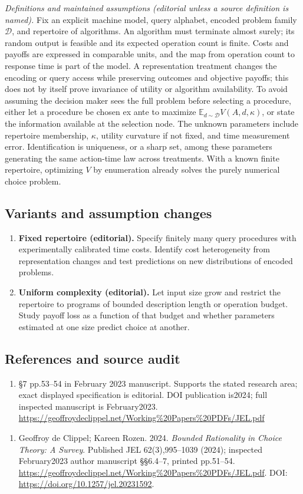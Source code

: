 \documentclass[11pt,a4paper]{article}
\begin{document}
\emph{Definitions and maintained assumptions (editorial unless a source definition is named).} Fix an explicit machine model, query alphabet, encoded problem family \(\mathcal D\), and repertoire of algorithms. An algorithm must terminate almost surely; its random output is feasible and its expected operation count is finite. Costs and payoffs are expressed in comparable units, and the map from operation count to response time is part of the model. A representation treatment changes the encoding or query access while preserving outcomes and objective payoffs; this does not by itself prove invariance of utility or algorithm availability. To avoid assuming the decision maker sees the full problem before selecting a procedure, either let a procedure be chosen ex ante to maximize \(\mathbb E_{d\sim\mathcal D}V(A,d,\kappa)\), or state the information available at the selection node. The unknown parameters include repertoire membership, \(\kappa\), utility curvature if not fixed, and time measurement error. Identification is uniqueness, or a sharp set, among these parameters generating the same action-time law across treatments. With a known finite repertoire, optimizing \(V\) by enumeration already solves the purely numerical choice problem.
\subsection*{Variants and assumption changes}
\begin{enumerate}
\item \textbf{Fixed repertoire (editorial).} Specify finitely many query procedures with experimentally calibrated time costs. Identify cost heterogeneity from representation changes and test predictions on new distributions of encoded problems.
\item \textbf{Uniform complexity (editorial).} Let input size grow and restrict the repertoire to programs of bounded description length or operation budget. Study payoff loss as a function of that budget and whether parameters estimated at one size predict choice at another.
\end{enumerate}
\subsection*{References and source audit}
\begin{enumerate}
\item §7 pp.53–54 in February 2023 manuscript. Supports the stated research area; exact displayed specification is editorial. DOI publication is2024; full inspected manuscript is February2023. \url{https://geoffroydeclippel.net/Working%20Papers%20PDFs/JEL.pdf}
\end{enumerate}
\begin{enumerate}\raggedright
\item\hypertarget{definitions:source:30007556:1}{} Geoffroy de Clippel; Kareen Rozen. 2024. \emph{Bounded Rationality in Choice Theory: A Survey}. Published JEL 62(3),995–1039 (2024); inspected February2023 author manuscript §§6.4–7, printed pp.51–54.
\url{https://geoffroydeclippel.net/Working%20Papers%20PDFs/JEL.pdf}.
DOI: \url{https://doi.org/10.1257/jel.20231592}.
\end{enumerate}
\end{document}
